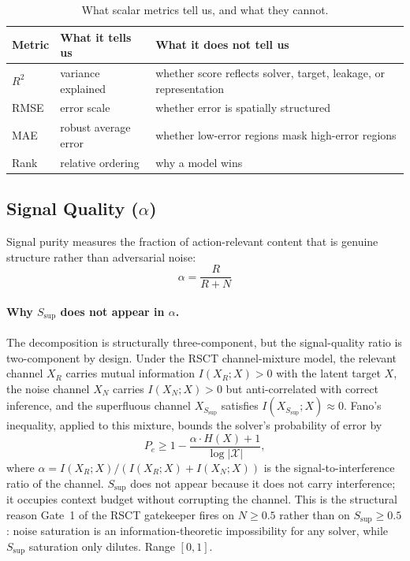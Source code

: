 \documentclass{article}
\begin{document}
\begin{table}[htbp]
\centering
\small
\caption{What scalar metrics tell us, and what they cannot.}
\label{tab:metric_limits}
\begin{tabular}{lll}
\toprule
\textbf{Metric} & \textbf{What it tells us} & \textbf{What it does not tell us} \\
\midrule
$R^2$ & variance explained & whether score reflects solver, target, leakage, or representation \\
RMSE & error scale & whether error is spatially structured \\
MAE & robust average error & whether low-error regions mask high-error regions \\
Rank & relative ordering & why a model wins \\
\bottomrule
\end{tabular}
\end{table}

\subsection{\texorpdfstring{Signal Quality ($\alpha$)}{Signal Quality (alpha)}}

Signal purity measures the fraction of action-relevant content that is genuine structure rather than adversarial noise:
\begin{equation}
\alpha = \frac{R}{R + N}
\label{eq:alpha}
\end{equation}

\paragraph{Why $S_{\text{sup}}$ does not appear in $\alpha$.} The decomposition is structurally three-component, but the signal-quality ratio is two-component by design. Under the RSCT channel-mixture model, the relevant channel $X_R$ carries mutual information $I(X_R; X) > 0$ with the latent target $X$, the noise channel $X_N$ carries $I(X_N; X) > 0$ but anti-correlated with correct inference, and the superfluous channel $X_{S_{\text{sup}}}$ satisfies $I(X_{S_{\text{sup}}}; X) \approx 0$. Fano's inequality, applied to this mixture, bounds the solver's probability of error by
\begin{equation}
P_e \geq 1 - \frac{\alpha \cdot H(X) + 1}{\log |\mathcal{X}|},
\end{equation}
where $\alpha = I(X_R; X) / (I(X_R; X) + I(X_N; X))$ is the signal-to-interference ratio of the channel. $S_{\text{sup}}$ does not appear because it does not carry interference; it occupies context budget without corrupting the channel. This is the structural reason Gate~1 of the RSCT gatekeeper fires on $N \geq 0.5$ rather than on $S_{\text{sup}} \geq 0.5$: noise saturation is an information-theoretic impossibility for any solver, while $S_{\text{sup}}$ saturation only dilutes. Range $[0,1]$.
\end{document}
